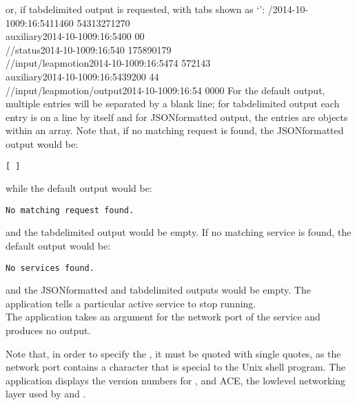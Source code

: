 \outputEnd{}
or, if tab\longDash{}delimited output is requested, with tabs shown as `\tabSymbol':
\outputBegin{}
/\dollarService\pseudotab{}2014-10-10\pseudotab{}09:16:54\pseudotab{}11460%
\pseudotab{}54313\pseudotab{}271\pseudotab{}270\\
auxiliary\pseudotab{}2014-10-10\pseudotab{}09:16:54\pseudotab{}0\pseudotab{}0\pseudotab{}%
0\pseudotab{}0\\
/\dollarService/status\pseudotab{}2014-10-10\pseudotab{}09:16:54\pseudotab{}0%
\pseudotab{}17589\pseudotab{}0\pseudotab{}179\\
/\serviceName/input/leapmotion\pseudotab{}2014-10-10\pseudotab{}09:16:54\pseudotab{}74%
\pseudotab{}5721\pseudotab{}4\pseudotab{}3\\
auxiliary\pseudotab{}2014-10-10\pseudotab{}09:16:54\pseudotab{}39\pseudotab{}200%
\pseudotab{}4\pseudotab{}4\\
/\serviceName/input/leapmotion/output\pseudotab{}2014-10-10\pseudotab{}09:16:54%
\pseudotab{}0\pseudotab{}0\pseudotab{}0\pseudotab{}0
\outputEnd{}
For the default output, multiple entries will be separated by a blank line; for
tab\longDash{}delimited output each entry is on a line by itself and for
JSON\longDash{}formatted output, the entries are objects within an array.
Note that, if no matching request is found, the JSON\longDash{}formatted output would be:
\outputBegin
\begin{verbatim}
[ ]
\end{verbatim}
\outputEnd{}
while the default output would be:
\outputBegin
\begin{verbatim}
No matching request found.
\end{verbatim}
\outputEnd{}
and the tab\longDash{}delimited output would be empty.
If no matching service is found, the default output would be:
\outputBegin
\begin{verbatim}
No services found.
\end{verbatim}
\outputEnd{}
and the JSON\longDash{}formatted and tab\longDash{}delimited outputs would be empty.
\condPage
{}
The application  tells a particular active service to stop
running.\\

The application takes an argument for the \yarp{} network port of the service and produces
no output.
\insertShortUtilityParameters{}

Note that, in order to specify the , it
must be quoted with single quotes, as the network port contains a character that is
special to the Unix shell program.
The application  displays the version numbers for \mplusm,
\yarp{} and ACE, the low\longDash{}level networking layer used by \mplusm{} and \yarp.\\

